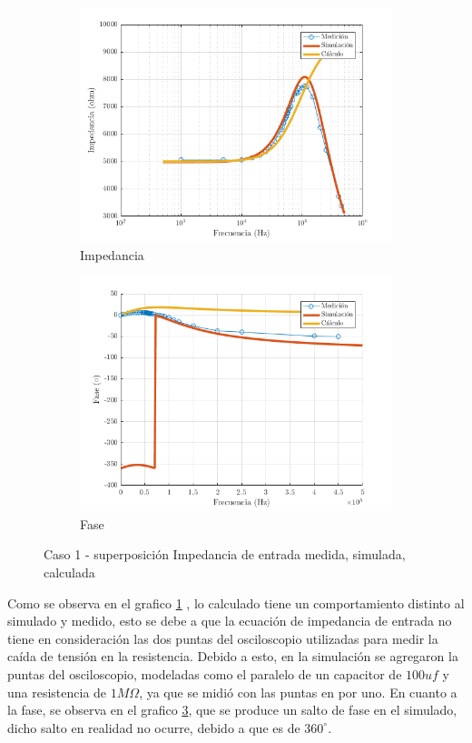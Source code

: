 \documentclass[../../main.tex]{subfiles}
\begin{document}
\begin{figure}[H]
\centering
\begin{subfigure}[http]{0.49\textwidth}
\includegraphics[width=\textwidth]{z_inv_r_c1}
\caption{Impedancia}\label{fig=zInvZc1}
\end{subfigure}
\begin{subfigure}[http]{0.49\textwidth}
\includegraphics[width=\textwidth]{z_inv_f_c1}
\caption{Fase} \label{fig=zInvFc1}
\end{subfigure}
\caption{Caso 1 - superposición Impedancia de entrada  medida, simulada, calculada}
\end{figure}

Como se observa en el grafico \ref{fig=zInvZc1} , lo calculado tiene un comportamiento distinto al simulado y medido, esto se debe a que  la ecuación de  impedancia de entrada no tiene en consideración las dos puntas del osciloscopio utilizadas para medir la caída de tensión en la resistencia. Debido a esto, en la simulación se agregaron la puntas del osciloscopio, modeladas como el paralelo de un capacitor de $100uf$ y una resistencia de $1M \Omega $, ya que se midió con las puntas en por uno.
En cuanto a la fase, se observa en el grafico \ref{fig=zInvFc1}, que se produce un salto de fase en el simulado, dicho salto en realidad no ocurre, debido a que es de $360^{\circ}$.
\end{document}
